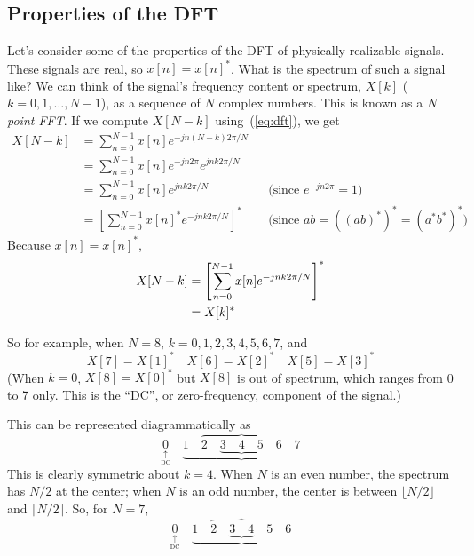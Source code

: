 \subsection{Properties of the DFT}

Let's consider some of the properties of the DFT of physically
realizable signals. These signals are real, so $x[n] = x[n]^*$. What
is the spectrum of such a signal like? We can think of the signal's
frequency content or spectrum, $X[k]$ ($k=0,1,\ldots,N-1$), as a
sequence of $N$ complex numbers. This is known as a \emph{$N$ point
FFT}. If we compute $X[N-k]$ using~(\ref{eq:dft}), we get
\begin{align*}
X[N-k] &= \sum_{n=0}^{N-1} x[n] e^{-j n (N-k) 2\pi/N} \\
&= \sum_{n=0}^{N-1} x[n] e^{-jn2\pi}e^{j n k 2\pi/N} \\
&= \sum_{n=0}^{N-1} x[n] e^{j n k 2\pi/N} &&\text{(since $e^{-jn2\pi}=1$)}\\
&= \left[\sum_{n=0}^{N-1} x[n]^* e^{-j n k 2\pi/N}\right]^* 
   &&\text{(since $ab = ((ab)^*)^* = (a^*b^*)^*$)}
\end{align*}
Because $x[n]=x[n]^*$,
\begin{align}
X[N-k]&= \left[\sum_{n=0}^{N-1} x[n] e^{-j n k 2\pi/N}\right]^* \notag\\
       &= X[k]^*
\end{align}

So for example, when $N=8$, $k=0, 1,2,3,4,5,6,7$, and
\begin{equation}
X[7]=X[1]^* \quad X[6]=X[2]^* \quad X[5]=X[3]^*
\end{equation}
(When $k=0$, $X[8]=X[0]^*$ but $X[8]$ is out of spectrum, which ranges
from 0 to 7 only. This is the ``DC'', or zero-frequency, component of
the signal.)

This can be represented diagrammatically as
\begin{equation}
\underset{\underset{\text{DC}}{\uparrow}}{0} \quad \underbrace{1 \quad
    \overbrace{2 \quad \underbrace{3 \quad 4 \quad 5} \quad 6} \quad 7}
\label{eq:dft8-freqs}
\end{equation}
This is clearly symmetric about $k=4$. When $N$ is an even number,
the spectrum has $N/2$ at the center; when $N$ is an odd number, the
center is between $\lfloor N/2 \rfloor$ and $\lceil N/2 \rceil$. So,
for $N=7$,
\begin{equation}
\underset{\underset{\text{DC}}{\uparrow}}{0} \quad \underbrace{1 \quad
  \overbrace{2 \quad \underbrace{3 \quad 4} \quad 5} \quad 6}
\end{equation}   

